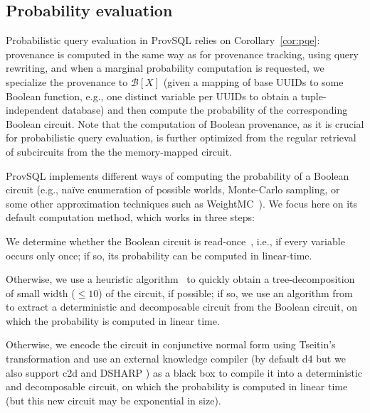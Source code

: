 \subsection{Probability evaluation}
\label{sec:impl_prob}

Probabilistic query evaluation in ProvSQL relies on
Corollary~\ref{cor:pqe}: provenance is computed in the same way as for
provenance tracking, using query rewriting, and when a marginal
probability computation is requested, we specialize the provenance to
$\mathcal{B}[X]$ (given a mapping of base UUIDs to some Boolean function,
e.g., one distinct variable per UUIDs to obtain a tuple-independent
database) and then compute the probability of the corresponding Boolean
circuit. Note that the computation of Boolean provenance, as it is
crucial for probabilistic query evaluation, is further optimized from the
regular retrieval of subcircuits from the the memory-mapped circuit.

ProvSQL implements different ways of computing the probability of a
Boolean circuit (e.g., naïve enumeration of possible worlds,
Monte-Carlo sampling, or some other approximation techniques such as
WeightMC~\cite{DBLP:conf/aaai/ChakrabortyFMSV14}). We focus here on its
default computation method, which works in three steps:
\begin{asparaenum}[(1)]
	\item We determine whether the Boolean circuit is
	read-once~\cite{DBLP:journals/pvldb/SenDG10}, i.e., if every variable
	occurs only once; if so, its probability can be computed in
	linear-time.
	\item Otherwise, we use a heuristic
	algorithm~\cite{maniu2019experimental} to quickly obtain a
	tree-decomposition of small width ($\leq 10$) of the circuit, if
	possible; if so,  we use an algorithm
	from~\cite{dblp:journals/mst/amarillicms20} to extract a
	deterministic and decomposable circuit from the Boolean circuit, on
	which the probability is computed in linear time.
	\item Otherwise, we encode the circuit in conjunctive normal form using
	Tseitin's transformation \cite{Tseitin1983} and use an external
	knowledge compiler (by default d4
	\cite{dblp:conf/ijcai/lagniezm17} but we also support c2d
	\cite{DBLP:conf/ecai/Darwiche04} and DSHARP
	\cite{DBLP:conf/ai/MuiseMBH12}) as a black box to compile it into a
	deterministic and decomposable circuit, on which the probability is
	computed in linear time (but this new circuit may be exponential in
	size).
\end{asparaenum}

